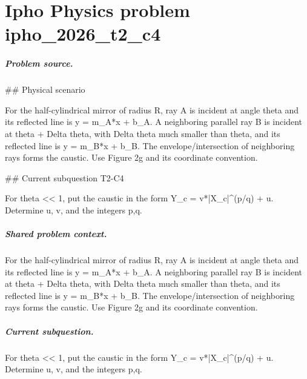 
\chapter{Ipho Physics problem ipho\_2026\_t2\_c4}
\label{ch:IPhO2026Problems_problem_ipho_2026_t2_c4}

\paragraph{Problem source.}
\#\# Physical scenario

For the half-cylindrical mirror of radius R, ray A is incident at angle theta
and its reflected line is y = m\_A*x + b\_A.  A neighboring parallel ray B is
incident at theta + Delta theta, with Delta theta much smaller than theta, and
its reflected line is y = m\_B*x + b\_B.  The envelope/intersection of neighboring
rays forms the caustic.  Use Figure 2g and its coordinate convention.

\#\# Current subquestion T2-C4

For theta << 1, put the caustic in the form Y\_c = v*|X\_c|\textasciicircum{}(p/q) + u. Determine u, v, and the integers p,q.

\paragraph{Shared problem context.}
For the half-cylindrical mirror of radius R, ray A is incident at angle theta
and its reflected line is y = m\_A*x + b\_A.  A neighboring parallel ray B is
incident at theta + Delta theta, with Delta theta much smaller than theta, and
its reflected line is y = m\_B*x + b\_B.  The envelope/intersection of neighboring
rays forms the caustic.  Use Figure 2g and its coordinate convention.

\paragraph{Current subquestion.}
For theta << 1, put the caustic in the form Y\_c = v*|X\_c|\textasciicircum{}(p/q) + u. Determine u, v, and the integers p,q.

